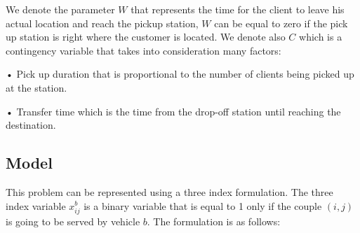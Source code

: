 \documentclass{article}
\begin{document}
We denote the parameter $W$ that represents the time for the client to leave his actual location and reach the pickup station, $W$ can be equal to zero if the pick up station is right where the 
customer is located. We denote also $C$ which is a contingency variable that takes into consideration many factors: \\
\begin{list}{}
\item •  Pick up duration that is proportional to the number of clients being picked up at the station.
\item •  Transfer time which is the time from the drop-off station until reaching the destination.
\end{list} 

\subsection{Model}
\label{subsection:model}

This problem can be represented using a three index formulation. The three index variable $x_{ij}^{b}$ is a binary variable that is equal to 1 only if the couple  $(i,j)$ is going to be served by vehicle $b$. The formulation is as follows:
\end{document}
